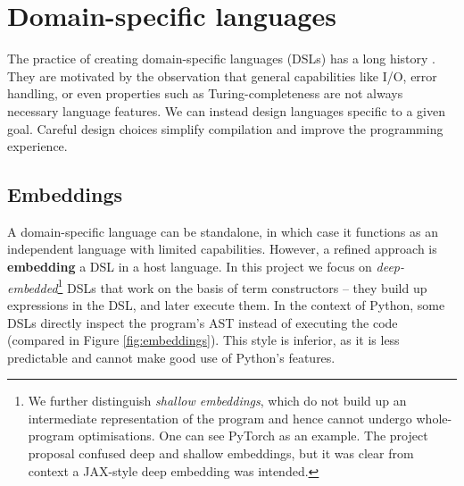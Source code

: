 

\section{Domain-specific languages}
\label{domain-specific-languages}

The practice of creating domain-specific languages (DSLs) has a long history \cite{hudak1996building}. They are motivated by the observation that general capabilities like I/O, error handling, or even properties such as Turing-completeness are not always necessary language features. We can instead design languages specific to a given goal. Careful design choices simplify compilation and improve the programming experience.

\subsection{Embeddings}

A domain-specific language can be standalone, in which case it functions as an independent language with limited capabilities. 
However, a refined approach is \textbf{embedding} a DSL in a host language. 
In this project we focus on \textit{deep-embedded}\footnote{We further distinguish \textit{shallow embeddings}, which do not build up an intermediate representation of the program \cite{gibbons2014folding} and hence cannot undergo whole-program optimisations. One can see PyTorch as an example. The project proposal confused deep and shallow embeddings, but it was clear from context a JAX-style deep embedding was intended.} DSLs that work on the basis of term constructors -- they build up expressions in the DSL, and later execute them. 
In the context of Python, some DSLs directly inspect the program's AST instead of executing the code (compared in Figure \ref{fig:embeddings}). 
This style is inferior, as it is less predictable and cannot make good use of Python's features. 

